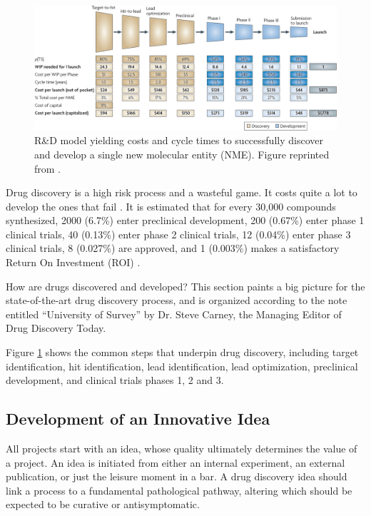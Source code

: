 \begin{figure}
\centering
\includegraphics[width=\textwidth]{Background/DrugDiscoveryProcess.png}
\caption{R\&D model yielding costs and cycle times to successfully discover and develop a single new molecular entity (NME). Figure reprinted from \citep{716}.}
\label{fig:DrugDiscoveryProcess}
\end{figure}

Drug discovery is a high risk process and a wasteful game. It costs quite a lot to develop the ones that fail \citep{688}. It is estimated that for every 30,000 compounds synthesized, 2000 (6.7\%) enter preclinical development, 200 (0.67\%) enter phase 1 clinical trials, 40 (0.13\%) enter phase 2 clinical trials, 12 (0.04\%) enter phase 3 clinical trials, 8 (0.027\%) are approved, and 1 (0.003\%) makes a satisfactory Return On Investment (ROI) \citep{713}.

How are drugs discovered and developed? This section paints a big picture for the state-of-the-art drug discovery process, and is organized according to the note entitled ``University of Survey'' by Dr. Steve Carney, the Managing Editor of Drug Discovery Today.

Figure \ref{fig:DrugDiscoveryProcess} \citep{716} shows the common steps that underpin drug discovery, including target identification, hit identification, lead identification, lead optimization, preclinical development, and clinical trials phases 1, 2 and 3.

\subsection{Development of an Innovative Idea}

All projects start with an idea, whose quality ultimately determines the value of a project. An idea is initiated from either an internal experiment, an external publication, or just the leisure moment in a bar. A drug discovery idea should link a process to a fundamental pathological pathway, altering which should be expected to be curative or antisymptomatic.

